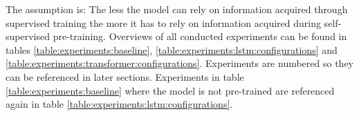 The assumption is: The less the model can rely on information acquired through supervised training the more it has to rely on information acquired during self-supervised pre-training. Overviews of all conducted experiments can be found in tables \ref{table:experiments:baseline}, \ref{table:experiments:lstm:configurations} and \ref{table:experiments:transformer:configurations}.
Experiments are numbered so they can be referenced in later sections. Experiments in table \ref{table:experiments:baseline} where the model is not pre-trained are referenced again in table \ref{table:experiments:lstm:configurations}.

\begin{table}[]
\end{table}
